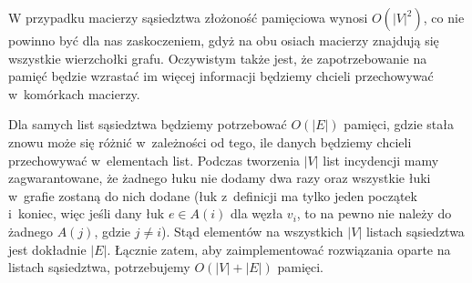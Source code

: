 W przypadku macierzy sąsiedztwa złożoność pamięciowa wynosi $O \left( \left| V \right| ^{2} \right)$, co nie powinno być dla nas zaskoczeniem, gdyż na obu osiach macierzy znajdują się wszystkie wierzchołki grafu.
Oczywistym także jest, że zapotrzebowanie na pamięć będzie wzrastać im więcej informacji będziemy chcieli przechowywać w~komórkach macierzy.

Dla samych list sąsiedztwa będziemy potrzebować $O \left( \left| E \right| \right)$ pamięci, gdzie stała znowu może się różnić w~zależności od tego, ile danych będziemy chcieli przechowywać w~elementach list.
Podczas tworzenia $\left| V \right|$ list incydencji mamy zagwarantowane, że żadnego łuku nie dodamy dwa razy oraz wszystkie łuki w~grafie zostaną do nich dodane (łuk z~definicji ma tylko jeden początek i~koniec, więc jeśli dany łuk $e \in A \left( i \right)$ dla węzła $v_{i}$, to na pewno nie należy do żadnego $A \left( j \right)$, gdzie $j \neq i$).
Stąd elementów na wszystkich $\left| V \right|$ listach sąsiedztwa jest dokładnie $\left| E \right|$.
Łącznie zatem, aby zaimplementować rozwiązania oparte na listach sąsiedztwa, potrzebujemy $O \left( \left| V \right| + \left| E \right| \right)$ pamięci.


